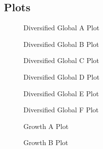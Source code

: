 \begin{appendices}
\section{Plots}
\begin{figure}[htbp]
    \centering
    \caption{Diversified Global A Plot}
    
    \label{fig:DiversifiedGlobalA_plot}
\end{figure}

\begin{figure}[htbp]
    \centering
    \caption{Diversified Global B Plot}
    
    \label{fig:DiversifiedGlobalB_plot}
\end{figure}

\begin{figure}[htbp]
    \centering
    \caption{Diversified Global C Plot}
    
    \label{fig:DiversifiedGlobalC_plot}
\end{figure}

\begin{figure}[htbp]
    \centering
    \caption{Diversified Global D Plot}
    
    \label{fig:DiversifiedGlobalD_plot}
\end{figure}

\begin{figure}[htbp]
    \centering
    \caption{Diversified Global E Plot}
    
    \label{fig:DiversifiedGlobalE_plot}
\end{figure}

\begin{figure}[htbp]
    \centering
    \caption{Diversified Global F Plot}
    
    \label{fig:DiversifiedGlobalF_plot}
\end{figure}

\begin{figure}[htbp]
    \centering
    \caption{Growth A Plot}
    
    \label{fig:GrowthA_plot}
\end{figure}

\begin{figure}[htbp]
    \centering
    \caption{Growth B Plot}
    
    \label{fig:GrowthB_plot}
\end{figure}


\end{appendices}

